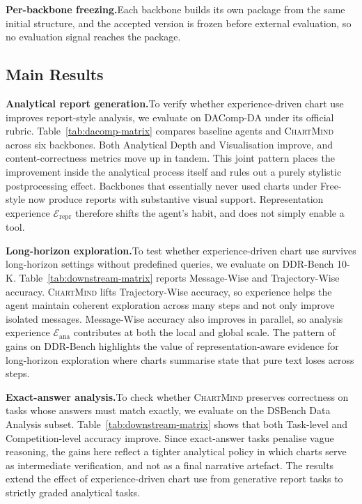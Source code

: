 \documentclass{article}
\newcommand{\method}{\textsc{ChartMind}\xspace}
\newcommand{\stitle}[1]{\noindent\textbf{#1}}
\begin{document}
\stitle{Per-backbone freezing.}\quad Each backbone builds its own package from the same initial structure, and the accepted version is frozen before external evaluation, so no evaluation signal reaches the package.

\subsection{Main Results}
\label{sec:main-results}

\stitle{Analytical report generation.}\quad To verify whether experience-driven chart use improves report-style analysis, we evaluate on DAComp-DA under its official rubric. Table~\ref{tab:dacomp-matrix} compares baseline agents and \method{} across six backbones. Both Analytical Depth and Visualisation improve, and content-correctness metrics move up in tandem. This joint pattern places the improvement inside the analytical process itself and rules out a purely stylistic postprocessing effect. Backbones that essentially never used charts under Free-style now produce reports with substantive visual support. Representation experience $\mathcal{E}_{\mathrm{repr}}$ therefore shifts the agent's habit, and does not simply enable a tool.

\stitle{Long-horizon exploration.}\quad To test whether experience-driven chart use survives long-horizon settings without predefined queries, we evaluate on DDR-Bench 10-K. Table~\ref{tab:downstream-matrix} reports Message-Wise and Trajectory-Wise accuracy. \method{} lifts Trajectory-Wise accuracy, so experience helps the agent maintain coherent exploration across many steps and not only improve isolated messages. Message-Wise accuracy also improves in parallel, so analysis experience $\mathcal{E}_{\mathrm{ana}}$ contributes at both the local and global scale. The pattern of gains on DDR-Bench highlights the value of representation-aware evidence for long-horizon exploration where charts summarise state that pure text loses across steps.

\stitle{Exact-answer analysis.}\quad To check whether \method{} preserves correctness on tasks whose answers must match exactly, we evaluate on the DSBench Data Analysis subset. Table~\ref{tab:downstream-matrix} shows that both Task-level and Competition-level accuracy improve. Since exact-answer tasks penalise vague reasoning, the gains here reflect a tighter analytical policy in which charts serve as intermediate verification, and not as a final narrative artefact. The results extend the effect of experience-driven chart use from generative report tasks to strictly graded analytical tasks.
\end{document}
